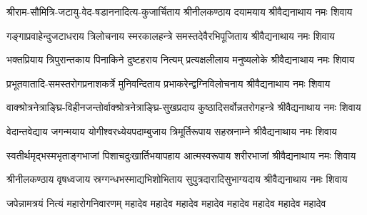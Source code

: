 
\twolineshloka
{श्रीराम-सौमित्रि-जटायु-वेद-षडाननादित्य-कुजार्चिताय}
{श्रीनीलकण्ठाय दयामयाय श्रीवैद्यनाथाय नमः शिवाय}

%
\twolineshloka
{गङ्गाप्रवाहेन्दुजटाधराय त्रिलोचनाय स्मरकालहन्त्रे}
{समस्तदेवैरभिपूजिताय श्रीवैद्यनाथाय नमः शिवाय}

\twolineshloka
{भक्तप्रियाय त्रिपुरान्तकाय पिनाकिने दुष्टहराय नित्यम्}
{प्रत्यक्षलीलाय मनुष्यलोके श्रीवैद्यनाथाय नमः शिवाय}

\twolineshloka
{प्रभूतवातादि-समस्तरोगप्रनाशकर्त्रे मुनिवन्दिताय}
{प्रभाकरेन्द्वग्निविलोचनाय श्रीवैद्यनाथाय नमः शिवाय}

\twolineshloka
{वाक्श्रोत्रनेत्राङ्घ्रि-विहीनजन्तोर्वाक्श्रोत्रनेत्राङ्घ्रि-सुखप्रदाय}
{कुष्ठादिसर्वोन्नतरोगहन्त्रे श्रीवैद्यनाथाय नमः शिवाय}

\twolineshloka
{वेदान्तवेद्याय जगन्मयाय योगीश्वरध्येयपदाम्बुजाय}
{त्रिमूर्तिरूपाय सहस्रनाम्ने श्रीवैद्यनाथाय नमः शिवाय}

\twolineshloka
{स्वतीर्थमृद्भस्मभृताङ्गभाजां पिशाचदुःखार्तिभयापहाय}
{आत्मस्वरूपाय शरीरभाजां श्रीवैद्यनाथाय नमः शिवाय}

\twolineshloka
{श्रीनीलकण्ठाय वृषध्वजाय स्रग्गन्धभस्माद्यभिशोभिताय}
{सुपुत्रदारादिसुभाग्यदाय श्रीवैद्यनाथाय नमः शिवाय}

{जपेन्नामत्रयं नित्यं महारोगनिवारणम्}
{महादेव महादेव महादेव महादेव महादेव महादेव महादेव महादेव}
